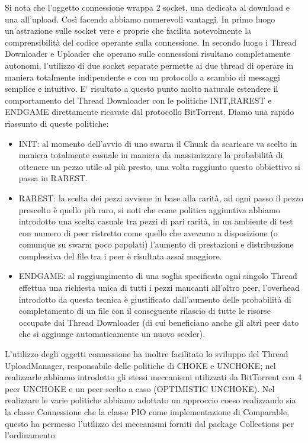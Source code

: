 Si nota che l'oggetto connessione wrappa 2 socket, una dedicata al download e una all'upload. Cos\`i facendo abbiamo numerevoli vantaggi. In primo luogo un'astrazione sulle socket vere e proprie che facilita notevolmente la comprensibilit\`a del codice operante sulla connessione. In secondo luogo i Thread Downloader e Uploader che operano sulle connessioni risultano completamente autonomi, l'utilizzo di due socket separate permette ai due thread di operare in maniera totalmente indipendente e con un protocollo a scambio di messaggi semplice e intuitivo. E` risultato a questo punto molto naturale estendere il comportamento del Thread Downloader con le politiche INIT,RAREST e ENDGAME direttamente ricavate dal protocollo BitTorrent.
Diamo una rapido riassunto di queste politiche:
\begin{itemize}
\item INIT: al momento dell'avvio di uno swarm il Chunk da scaricare va scelto in maniera totalmente casuale in maniera da massimizzare la probabilit\`a di ottenere un pezzo utile al pi\`u presto, una volta raggiunto questo obbiettivo si passa in RAREST.
\item RAREST: la scelta dei pezzi avviene in base alla rarit\`a, ad ogni passo il pezzo prescelto \`e quello pi\`u raro, si noti che come politica aggiuntiva abbiamo introdotto una scelta casuale tra pezzi di pari rarit\`a, in un ambiente di test con numero di peer ristretto come quello che avevamo a disposizione (o comunque su swarm poco popolati) l'aumento di prestazioni e distribuzione complessiva del file tra i peer \`e risultata assai maggiore.
\item ENDGAME: al raggiungimento di una soglia specificata ogni singolo Thread effettua una richiesta unica di tutti i pezzi mancanti all'altro peer, l'overhead introdotto da questa tecnica \`e giustificato dall'aumento delle probabilit\`a di completamento di un file con il conseguente rilascio di tutte le risorse occupate dai Thread Downloader (di cui beneficiano anche gli altri peer dato che si aggiunge automaticamente un nuovo seeder).
\end{itemize} L'utilizzo degli oggetti connessione ha inoltre facilitato lo sviluppo del Thread UploadManager, responsabile delle politiche di CHOKE e UNCHOKE; nel realizzarle abbiamo introdotto gli stessi meccanismi utilizzati da BitTorrent con 4 peer UNCHOKE e un peer scelto a caso (OPTIMISTIC UNCHOKE). Nel realizzare le varie politiche abbiamo adottato un approccio coeso realizzando sia la classe Connessione che la classe PIO come implementazione di Comparable, questo ha permesso l'utilizzo dei meccanismi forniti dal package Collections per l'ordinamento:
